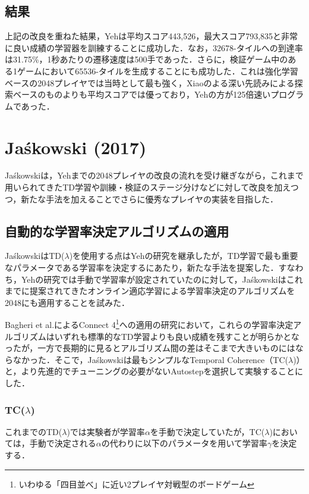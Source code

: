 \documentclass{suribt}
\begin{document}
\subsection{結果}
上記の改良を重ねた結果，Yehは平均スコア443,526，最大スコア793,835と非常に良い成績の学習器を訓練することに成功した．なお，32678-タイルへの到達率は31.75\%，1秒あたりの遷移速度は500手であった．さらに，検証ゲーム中のある1ゲームにおいて65536-タイルを生成することにも成功した．これは強化学習ベースの2048プレイヤでは当時として最も強く，Xiaoのよる深い先読みによる探索ベースのものよりも平均スコアでは優っており，Yehの方が125倍速いプログラムであった．

\section{Ja\'{s}kowski (2017)}
Ja\'{s}kowskiは，Yehまでの2048プレイヤの改良の流れを受け継ぎながら，これまで用いられてきたTD学習や訓練・検証のステージ分けなどに対して改良を加えつつ，新たな手法を加えることでさらに優秀なプレイヤの実装を目指した．

\subsection{自動的な学習率決定アルゴリズムの適用}
Ja\'{s}kowskiはTD(${\lambda}$)を使用する点はYehの研究を継承したが，TD学習で最も重要なパラメータである学習率を決定するにあたり，新たな手法を提案した．すなわち，Yehの研究では手動で学習率が設定されていたのに対して，Ja\'{s}kowskiはこれまでに提案されてきたオンライン適応学習による学習率決定のアルゴリズムを2048にも適用することを試みた．

Bagheri et al.によるConnect 4\footnote{いわゆる「四目並べ」に近い2プレイヤ対戦型のボードゲーム}への適用の研究において，これらの学習率決定アルゴリズムはいずれも標準的なTD学習よりも良い成績を残すことが明らかとなったが\cite{Bagheri}，一方で長期的に見るとアルゴリズム間の差はそこまで大きいものにはならなかった．そこで，Ja\'{s}kowskiは最もシンプルなTemporal Coherence（TC(${\lambda}$)）と，より先進的でチューニングの必要がないAutostepを選択して実験することにした．

\subsubsection{TC(${\lambda}$)}
これまでのTD(${\lambda}$)では実験者が学習率${\alpha}$を手動で決定していたが，TC(${\lambda}$)においては，手動で決定される${\alpha}$の代わりに以下のパラメータを用いて学習率${\gamma}$を決定する．
\end{document}
